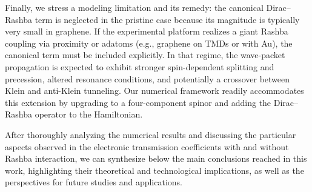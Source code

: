 Finally, we stress a modeling limitation and its remedy: the canonical Dirac–Rashba term is neglected in the pristine case because its magnitude is typically very small in graphene.
If the experimental platform realizes a giant Rashba coupling via proximity or adatoms (e.g., graphene on TMDs or with Au), the canonical term must be included explicitly.
In that regime, the wave-packet propagation is expected to exhibit stronger spin-dependent splitting and precession, altered resonance conditions, and potentially a crossover between Klein and anti-Klein tunneling\cite{DellAnnaJPhysCondMatt2018, AvsarNatCommun2014, WangPhysRevX2016}.
Our numerical framework readily accommodates this extension by upgrading to a four-component spinor and adding the Dirac–Rashba operator to the Hamiltonian.


After thoroughly analyzing the numerical results and discussing the particular aspects observed in the electronic transmission coefficients with and without Rashba interaction, we can synthesize below the main conclusions reached in this work, highlighting their theoretical and technological implications, as well as the perspectives for future studies and applications.
